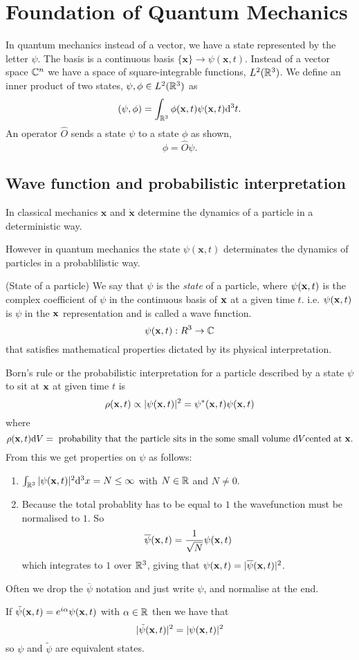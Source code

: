 \documentclass{article}
\begin{document}
\section{Foundation of Quantum Mechanics}
In quantum mechanics instead of a vector, we have a state represented by the letter $ \psi $. The basis is a continuous basis $ \{\mathbf x\}\to \psi(\mathbf x, t) $. Instead of a vector space $ \mathbb{C}^n $ we have a space of square-integrable functions, $ L^2(\mathbb{R}^3) $. We define an inner product of two states, $ \psi,\phi\in L^2(\mathbb{R}^3) $ as
\[
	(\psi,\phi)=\int_{\mathbb{R}^3}\phi(\mathbf x,t)\psi(\mathbf x,t)\mathrm d^3t.
\]
An operator $ \hat O $ sends a state $ \psi $ to a state $ \phi $ as shown,
\[
  \phi=\hat O\psi.
\]
\subsection{Wave function and probabilistic interpretation}
In classical mechanics $ \mathbf x $ and $ \dot{\mathbf x} $ determine the dynamics of a particle in a deterministic way.\par
However in quantum mechanics the state $ \psi(\mathbf x,t) $ determinates the dynamics of particles in a probablilistic way.
\begin{definition}
	(State of a particle) We say that $ \psi $ is the \textit{state} of a particle, where $ \psi(\mathbf{x},t) $ is the complex coefficient of $ \psi $ in the continuous basis of $ \mathbf{x} $ at a given time $ t $. i.e. $ \psi(\mathbf{x},t) $ is $ \psi $ in the $ \mathbf{x} $ representation and is called a wave function.
	\[
	  \psi(\mathbf{x},t):R^3\to \mathbb{C}
	\]
	that satisfies mathematical properties dictated by its physical interpretation.
\end{definition}
Born's rule or the probabilistic interpretation for a particle described by a state $ \psi $ to sit at $ \mathbf{x} $ at given time $ t $ is
\[
  \rho(\mathbf{x},t)\propto|\psi(\mathbf{x},t)|^2=\psi^*(\mathbf{x},t)\psi(\mathbf{x},t)
\]
where
\[
	\rho(\mathbf{x},t)\mathrm dV=\text{ probability that the particle sits in the some small volume } \mathrm dV \text {cented at } \mathbf{x}.
\]
From this we get properties on $ \psi $ as follows:
\begin{enumerate}
	\item $ \int_{\mathbb{R}^3}|\psi(\mathbf{x},t)|^2\mathrm d^3x=N\le\infty $ with $ N\in\mathbb{R} $ and $ N\ne 0 $.
	\item Because the total probablity has to be equal to $ 1 $ the wavefunction must be normalised to $ 1 $. So
		\[
			\overline\psi(\mathbf{x},t)=\frac{1}{\sqrt N}\psi(\mathbf{x},t)
		\]
		which integrates to $ 1 $ over $ \mathbb{R}^3 $, giving that $ \psi(\mathbf{x},t)=|\overline\psi(\mathbf{x},t)|^2 $.
\end{enumerate}
\begin{remark}
Often we drop the $ \overline\psi $ notation and just write $ \psi $, and normalise at the end.
\end{remark}
If $ \tilde{\psi}(\mathbf{x},t) =e^{i\alpha}\psi(\mathbf{x},t) $ with $ \alpha\in \mathbb{R} $ then we have that
\[
	|\tilde{\psi}(\mathbf{x},t)|^2=|\psi(\mathbf{x},t)|^2
\]
so $ \psi $ and $ \tilde\psi $ are equivalent states.
\end{document}
